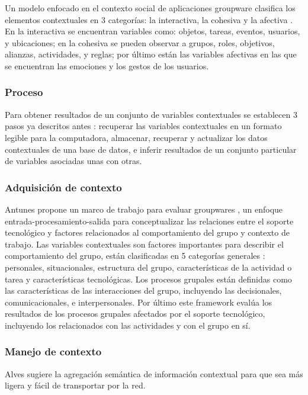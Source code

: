 Un modelo enfocado en el contexto social de aplicaciones groupware clasifica los elementos contextuales en 3 categor\'ias: la interactiva, la cohesiva y la afectiva \cite{montane2013context}. En la interactiva se encuentran variables como: objetos, tareas, eventos, usuarios, y ubicaciones; en la cohesiva se pueden observar a grupos, roles, objetivos, alianzas, actividades, y reglas; por \'ultimo est\'an las variables afectivas en las que se encuentran las emociones y los gestos de los usuarios.	
\subsubsection{Proceso}
Para obtener resultados de un conjunto de variables contextuales se establecen 3 pasos ya descritos antes \cite{montane2013context}: recuperar las variables contextuales en un formato legible para la computadora, almacenar, recuperar y actualizar los datos contextuales de una base de datos, e inferir resultados de un conjunto particular de variables asociadas unas con otras.

\subsubsection {Adquisici\'on de contexto}
 Antunes propone un marco de trabajo para evaluar groupwares \cite{antunes2008structuring}, un enfoque entrada-procesamiento-salida para conceptualizar las relaciones entre el soporte tecnol\'ogico y factores relacionados al comportamiento del grupo y contexto de trabajo. Las variables contextuales son factores importantes para describir el comportamiento del grupo, est\'an clasificadas en 5 categor\'ias generales \cite{antunes2008structuring}: personales, situacionales, estructura del grupo, caracter\'isticas de la actividad o tarea y caracter\'isticas tecnol\'ogicas. Los procesos grupales est\'an definidas como las caracter\'isticas de las interacciones del grupo, incluyendo las decisionales, comunicacionales, e interpersonales. Por \'ultimo este framework eval\'ua los resultados de los procesos grupales afectados por el soporte tecnol\'ogico, incluyendo los relacionados con las actividades y con el grupo en s\'i.

\subsubsection {Manejo de contexto}
Alves \cite{alves2013radiator} sugiere la agregaci\'on sem\'antica de informaci\'on contextual para que sea m\'as ligera y f\'acil de transportar por la red.

